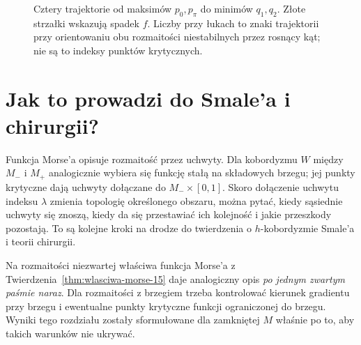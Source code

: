 \begin{figure}[H]
\centering
{}
\caption{Cztery trajektorie od maksimów $p_0,p_\pi$
do minimów $q_1,q_2$. Złote strzałki wskazują spadek $f$.
Liczby przy łukach to znaki trajektorii przy orientowaniu
obu rozmaitości niestabilnych przez rosnący kąt;
nie są to indeksy punktów krytycznych.}
\label{fig:morse-okrag-znaki-22}
\end{figure}

\section{Jak to prowadzi do Smale'a i chirurgii?}
\label{sec:morse-most-17}

Funkcja Morse'a opisuje rozmaitość
przez uchwyty. Dla kobordyzmu
$W$ między $M_-$ i $M_+$
analogicznie wybiera się funkcję
stałą na składowych brzegu;
jej punkty krytyczne dają
uchwyty dołączane do
$M_-\times[0,1]$.
Skoro dołączenie uchwytu
indeksu $\lambda$ zmienia
topologię określonego
obszaru, można pytać,
kiedy sąsiednie uchwyty
się znoszą, kiedy da
się przestawiać ich
kolejność i jakie
przeszkody pozostają.
To są kolejne kroki
na drodze do twierdzenia
o $h$-kobordyzmie
Smale'a i teorii chirurgii.

Na rozmaitości niezwartej
właściwa funkcja Morse'a
z Twierdzenia~\ref{thm:wlasciwa-morse-15}
daje analogiczny opis
\emph{po jednym zwartym
paśmie naraz}. Dla
rozmaitości z brzegiem
trzeba kontrolować
kierunek gradientu
przy brzegu i ewentualne
punkty krytyczne
funkcji ograniczonej
do brzegu. Wyniki
tego rozdziału zostały
sformułowane dla
zamkniętej $M$ właśnie
po to, aby takich
warunków nie ukrywać.

